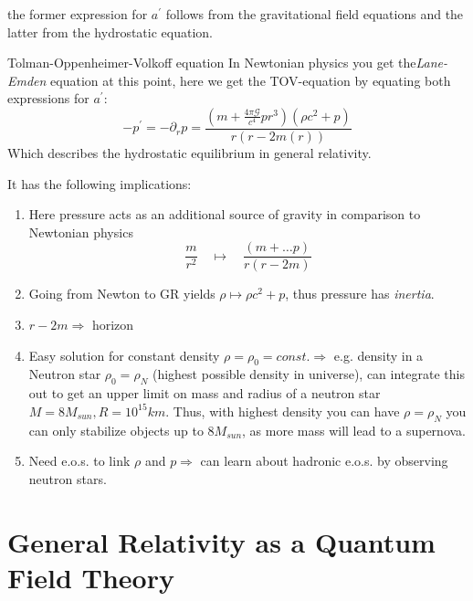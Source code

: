  the former expression for $a^{'}$ follows from the gravitational field equations and the latter from the hydrostatic equation.
 \begin{mybox}{Tolman-Oppenheimer-Volkoff equation}
 	In Newtonian physics you get the\emph{Lane-Emden} equation at this point, here we get the TOV-equation by equating both expressions for $a^{'} $:
 	\begin{equation}
 		- p^{'}=-\partial_r p = \frac{\left(m+ \frac{4\pi \mathcal{G}}{c^4} p r^3\right) (\rho c^2 +p )}{r(r-2m(r)) }
 	\end{equation}
 	Which describes the hydrostatic equilibrium in general relativity.
 \end{mybox}
It has the following implications:
\begin{enumerate}
	\item Here pressure acts as an additional source of gravity in comparison to Newtonian physics
	\begin{equation}
		\frac{m}{r^2} \quad \mapsto \quad \frac{(m+ \dots p)}{r(r-2m)}
	\end{equation}
	\item Going from Newton to GR yields $\rho \mapsto \rho c^2 +p$, thus pressure has \emph{inertia}.
	\item $r-2m \Rightarrow$ horizon
	\item Easy solution for constant density $\rho=\rho_0=const. \Rightarrow$ e.g. density in a Neutron star $\rho_0 = \rho_N$ (highest possible density in universe), can integrate this out to get an upper limit on mass and radius of a neutron star $M=8 M_{sun}, R=10^{15}km$. Thus, with highest density you can have $\rho = \rho_N$ you can only stabilize objects up to $8 M_{sun}$, as more mass will lead to a supernova.
	\item Need e.o.s. to link $\rho$ and $p \Rightarrow$ can learn about hadronic e.o.s. by observing neutron stars.
	
\end{enumerate}
	
	
	
	
	\newpage
	
	
	
	
	
	
	
	

	\chapter{General Relativity as a Quantum Field Theory}
